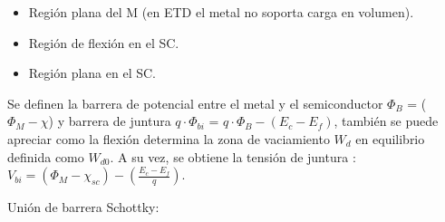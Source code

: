 \documentclass[a4paper]{article}
\begin{document}
\begin{itemize}
	\item Región plana del M (en ETD el metal no soporta carga en volumen).
	\item Región de flexión en el SC.
	\item Región plana en el SC.
\end{itemize}

Se definen la barrera de potencial entre el metal y el semiconductor $\Phi_B$ = ($\Phi_M - \chi$) y barrera de juntura $q\cdot \Phi_{bi}$ = $q\cdot \Phi_B -  (E_c - E_f)$, también se puede apreciar como la flexión determina la zona de vaciamiento $W_d$ en equilibrio definida como $W_{d0}$. A su vez, se obtiene la tensión de juntura : $ V_{bi} = (\Phi_{M} - \chi_{sc} ) - ( \frac{E_c - E_f}{q}) $. 


Unión de barrera Schottky:
\end{document}
